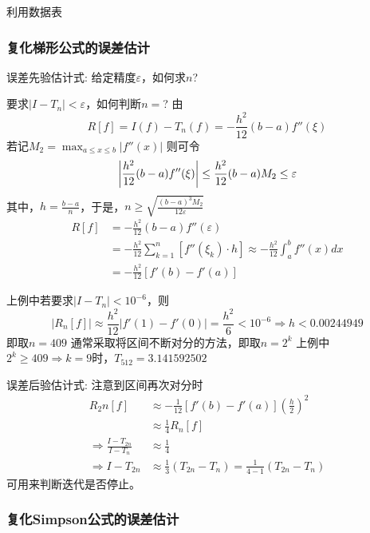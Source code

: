 \begin{example}
    利用数据表
\end{example}

\subsubsection{复化梯形公式的误差估计}

误差先验估计式:
给定精度$\varepsilon $，如何求$n$?
\begin{example}
     要求$|I-T_n|<\varepsilon$，如何判断$n=$?
    由
    \begin{equation*}
        R[f] = I(f)-T_n(f) = -\frac{h^2}{12}(b-a)f''(\xi )
    \end{equation*}
    若记$M_2 = \max_{a\leq x\leq b}|f''(x)|$
    则可令
    \begin{equation*}
    \abs{\frac{h^2}{12}(b-a)f''(\xi )}\leq \frac{h^2}{12}(b-a)M_2 \leq \varepsilon
    \end{equation*}
    其中，$h=\frac{b-a}{n}$，于是，$n\geq \sqrt{\frac{(b-a)^3M_2}{12\varepsilon}} $
    \begin{align*}
        R[f] &= -\frac{h^2}{12}(b-a)f''(\varepsilon) \\
        &= -\frac{h^2}{12}\sum_{k=1}^{n}[f''(\xi_k)\cdot h] \approx -\frac{h^2}{12}\int_{a}^{b}f''(x)dx \\
        &= -\frac{h^2}{12}[f'(b)-f'(a)]
    \end{align*}
\end{example}
上例中若要求$|I-T_n|<10^{-6}$，则
\begin{equation*}
    |R_n[f]| \approx \frac{h^2}{12}|f'(1)-f'(0)| = \frac{h^2}{6}<10^{-6}
    \Rightarrow h<0.00244949 
\end{equation*}
即取$n=409$
通常采取将区间不断对分的方法，即取$n = 2^k$
上例中$2^k \geq 409 \Rightarrow k=9$时，$T_512=3.141592502$

误差后验估计式:
注意到区间再次对分时
\begin{align*}
    R_2n[f]&\approx -\frac{1}{12}[f'(b)-f'(a)](\frac{h}{2})^2 \\
    &\approx \frac{1}{4}R_n[f] \\
    \Rightarrow \frac{I-T_{2n}}{I-T_n} &\approx \frac{1}{4} \\
    \Rightarrow I-T_{2n} &\approx \frac{1}{3}(T_{2n}-T_n) = \frac{1}{4-1}(T_{2n}-T_n) 
\end{align*}
可用来判断迭代是否停止。

\subsubsection{复化Simpson公式的误差估计}

